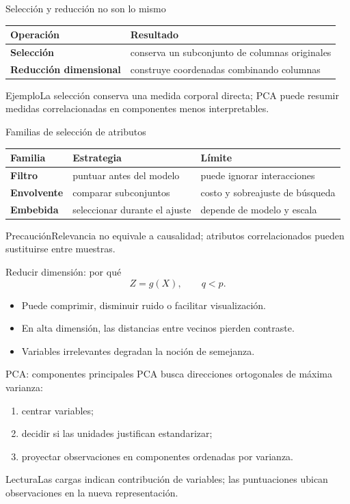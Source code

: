 \documentclass[aspectratio=169,10pt]{beamer}
\begin{document}
\begin{frame}{Selección y reducción no son lo mismo}\small
\begin{tabularx}{\textwidth}{>{\bfseries}p{}X}\toprule Operación & Resultado\\\midrule Selección & conserva un subconjunto de columnas originales\\ Reducción dimensional & construye coordenadas combinando columnas\\\bottomrule\end{tabularx}
\begin{block}{Ejemplo}La selección conserva una medida corporal directa; PCA puede resumir medidas correlacionadas en componentes menos interpretables.\end{block}
\end{frame}

\begin{frame}{Familias de selección de atributos}\small
\begin{tabularx}{\textwidth}{>{\bfseries}p{}XX}\toprule Familia & Estrategia & Límite\\\midrule Filtro & puntuar antes del modelo & puede ignorar interacciones\\ Envolvente & comparar subconjuntos & costo y sobreajuste de búsqueda\\ Embebida & seleccionar durante el ajuste & depende de modelo y escala\\\bottomrule\end{tabularx}
\begin{alertblock}{Precaución}Relevancia no equivale a causalidad; atributos correlacionados pueden sustituirse entre muestras.\end{alertblock}
\end{frame}

\begin{frame}{Reducir dimensión: por qué}\small
\[Z=g(X),\qquad q<p.\]
\begin{itemize}\item Puede comprimir, disminuir ruido o facilitar visualización.\item En alta dimensión, las distancias entre vecinos pierden contraste.\item Variables irrelevantes degradan la noción de semejanza.\end{itemize}
\end{frame}

\begin{frame}{PCA: componentes principales}\small
PCA busca direcciones ortogonales de máxima varianza:
\begin{enumerate}\item centrar variables;\item decidir si las unidades justifican estandarizar;\item proyectar observaciones en componentes ordenadas por varianza.\end{enumerate}
\begin{block}{Lectura}Las cargas indican contribución de variables; las puntuaciones ubican observaciones en la nueva representación.\end{block}
\end{frame}
\end{document}
